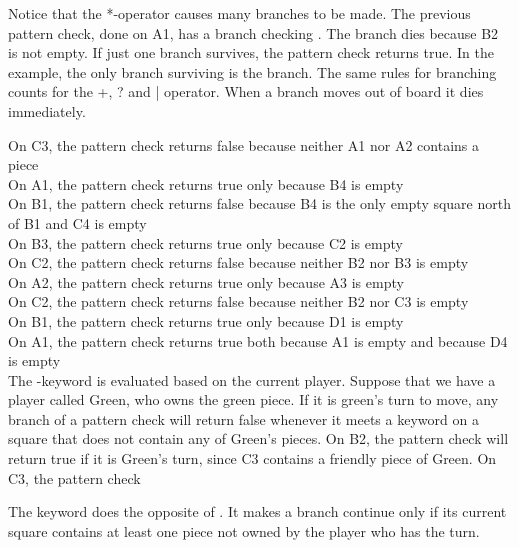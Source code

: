 Notice that the *-operator causes many branches to be made. The previous pattern check,  done on A1, has a branch checking . The branch dies because B2 is not empty. If just one branch survives, the pattern check returns true. In the example, the only branch surviving is the  branch. The same rules for branching counts for the +, ? and | operator. When a branch moves out of board it dies immediately.

On C3, the pattern check returns false because neither A1 nor A2 contains a piece\\
On A1, the pattern check returns true only because B4 is empty\\
On B1, the pattern check returns false because B4 is the only empty square north of B1 and C4 is empty\\
On B3, the pattern check returns true only because C2 is empty\\
On C2, the pattern check returns false because neither B2 nor B3 is empty\\
On A2, the pattern check returns true only because A3 is empty\\
On C2, the pattern check returns false because neither B2 nor C3 is empty\\
On B1, the pattern check returns true only because D1 is empty\\
On A1, the pattern check returns true both because A1 is empty and because D4 is empty\\

The -keyword is evaluated based on the current player. Suppose that we have a player called Green, who owns the 
green piece. If it is green's turn to move, any branch of a pattern check will return false
whenever it meets a keyword  on a square that does not contain any of Green's pieces.
On B2, the pattern check  will return true if it is Green's turn, since C3 contains a friendly piece of Green.
On C3, the pattern check 

The keyword  does the opposite of . It makes a branch continue only if its current square contains at least one piece not owned by the player who has the turn.

